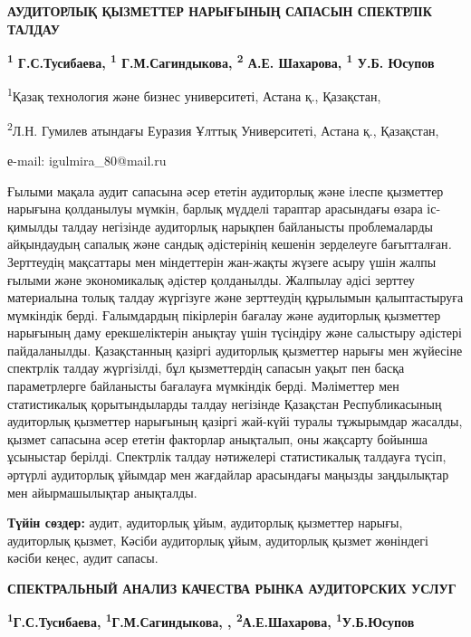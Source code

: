 \begin{articleheader}
{\bfseries АУДИТОРЛЫҚ ҚЫЗМЕТТЕР НАРЫҒЫНЫҢ САПАСЫН СПЕКТРЛІК ТАЛДАУ}

{\bfseries \textsuperscript{1} Г.С.Тусибаева\textsuperscript{\envelope},
\textsuperscript{1} Г.М.Сагиндыкова, \textsuperscript{2} А.Е. Шахарова,
\textsuperscript{1} У.Б. Юсупов}
\end{articleheader}

\begin{affiliation}

\textsuperscript{1}Қазақ технология және бизнес университеті, Астана қ.,
Қазақстан,

\textsuperscript{2}Л.Н. Гумилев атындағы Еуразия Ұлттық Университеті,
Астана қ., Қазақстан,

е-mail: igulmira\_80@mail.ru
\end{affiliation}

Ғылыми мақала аудит сапасына әсер ететін аудиторлық және ілеспе
қызметтер нарығына қолданылуы мүмкін, барлық мүдделі тараптар арасындағы
өзара іс-қимылды талдау негізінде аудиторлық нарықпен байланысты
проблемаларды айқындаудың сапалық және сандық әдістерінің кешенін
зерделеуге бағытталған\emph{.} Зерттеудің мақсаттары мен міндеттерін
жан-жақты жүзеге асыру үшін жалпы ғылыми және экономикалық әдістер
қолданылды. Жалпылау әдісі зерттеу материалына толық талдау жүргізуге
және зерттеудің құрылымын қалыптастыруға мүмкіндік берді. Ғалымдардың
пікірлерін бағалау және аудиторлық қызметтер нарығының даму
ерекшеліктерін анықтау үшін түсіндіру және салыстыру әдістері
пайдаланылды. Қазақстанның қазіргі аудиторлық қызметтер нарығы мен
жүйесіне спектрлік талдау жүргізілді, бұл қызметтердің сапасын уақыт пен
басқа параметрлерге байланысты бағалауға мүмкіндік берді. Мәліметтер мен
статистикалық қорытындыларды талдау негізінде Қазақстан Республикасының
аудиторлық қызметтер нарығының қазіргі жай-күйі туралы тұжырымдар
жасалды, қызмет сапасына әсер ететін факторлар анықталып, оны жақсарту
бойынша ұсыныстар берілді. Спектрлік талдау нәтижелері статистикалық
талдауға түсіп, әртүрлі аудиторлық ұйымдар мен жағдайлар арасындағы
маңызды заңдылықтар мен айырмашылықтар анықталды.

\textbf{Түйін сөздер:} аудит, аудиторлық ұйым, аудиторлық қызметтер
нарығы, аудиторлық қызмет, Кәсіби аудиторлық ұйым, аудиторлық қызмет
жөніндегі кәсіби кеңес, аудит сапасы.

\begin{articleheader}
{\bfseries СПЕКТРАЛЬНЫЙ АНАЛИЗ КАЧЕСТВА РЫНКА АУДИТОРСКИХ УСЛУГ}

{\bfseries \textsuperscript{1}Г.С.Тусибаева\textsuperscript{\envelope},
\textsuperscript{1}Г.М.Сагиндыкова, , \textsuperscript{2}А.Е.Шахарова,
\textsuperscript{1}У.Б.Юсупов}
\end{articleheader}

